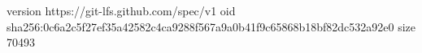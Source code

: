 version https://git-lfs.github.com/spec/v1
oid sha256:0c6a2c5f27ef35a42582c4ca9288f567a9a0b41f9c65868b18bf82dc532a92e0
size 70493
